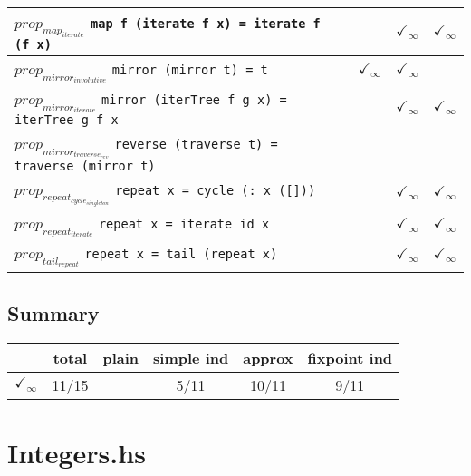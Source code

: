 \documentclass{article}
\begin{document}
\begin{longtable}{p{10cm} || c | c | c | c | }
\hline
$prop_{map_{iterate}}$ \newline \verb`map f (iterate f x) = iterate f (f x)` &  &  & $\checkmark_{\infty}$ & $\checkmark_{\infty}$ \\
\hline
$prop_{mirror_{involutive}}$ \newline \verb`mirror (mirror t) = t` &  & $\checkmark_{\infty}$ & $\checkmark_{\infty}$ &  \\
\hline
$prop_{mirror_{iterate}}$ \newline \verb`mirror (iterTree f g x) = iterTree g f x` &  &  & $\checkmark_{\infty}$ & $\checkmark_{\infty}$ \\
\hline
$prop_{mirror_{traverse_{rev}}}$ \newline \verb`reverse (traverse t) = traverse (mirror t)` &  &  &  &  \\
\hline
$prop_{repeat_{cycle_{singleton}}}$ \newline \verb`repeat x = cycle (: x ([]))` &  &  & $\checkmark_{\infty}$ & $\checkmark_{\infty}$ \\
\hline
$prop_{repeat_{iterate}}$ \newline \verb`repeat x = iterate id x` &  &  & $\checkmark_{\infty}$ & $\checkmark_{\infty}$ \\
\hline
$prop_{tail_{repeat}}$ \newline \verb`repeat x = tail (repeat x)` &  &  & $\checkmark_{\infty}$ & $\checkmark_{\infty}$ \\
\end{longtable}

\subsection*{Summary}
\begin{longtable}{p{4cm} || c | c | c | c | c | }
  & total & plain & simple ind & approx & fixpoint ind \\
\hline
$\checkmark_{\infty}$ & 11/15 &  & 5/11 & 10/11 & 9/11\\
\end{longtable}

\section*{Integers.hs}
\end{document}
